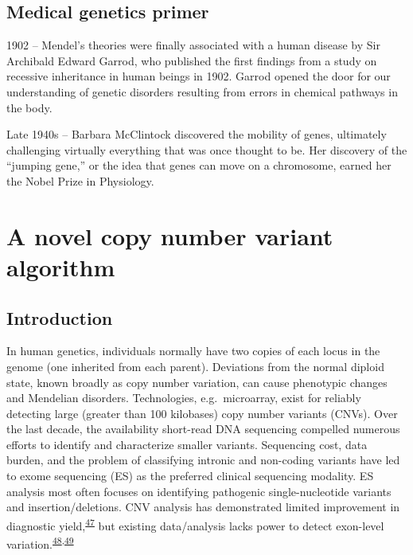 \documentclass[11pt,letterpaper]{book}
\begin{document}
\hypertarget{medical-genetics-primer}{%
\section{Medical genetics primer}\label{medical-genetics-primer}}

1902 -- Mendel's theories were finally associated with a human disease by Sir Archibald Edward Garrod, who published the first findings from a study on recessive inheritance in human beings in 1902. Garrod opened the door for our understanding of genetic disorders resulting from errors in chemical pathways in the body.

Late 1940s -- Barbara McClintock discovered the mobility of genes, ultimately challenging virtually everything that was once thought to be. Her discovery of the ``jumping gene,'' or the idea that genes can move on a chromosome, earned her the Nobel Prize in Physiology.

\hypertarget{a-novel-copy-number-variant-algorithm}{%
\chapter{A novel copy number variant algorithm}\label{a-novel-copy-number-variant-algorithm}}

\hypertarget{introduction}{%
\section{Introduction}\label{introduction}}

In human genetics, individuals normally have two copies of each locus in the genome (one inherited from each parent).
Deviations from the normal diploid state, known broadly as copy number variation, can cause phenotypic changes and Mendelian disorders.
Technologies, e.g.~microarray, exist for reliably detecting large (greater than 100 kilobases) copy number variants (CNVs).
Over the last decade, the availability short-read DNA sequencing compelled numerous efforts to identify and characterize smaller variants.
Sequencing cost, data burden, and the problem of classifying intronic and non-coding variants have led to exome sequencing (ES) as the preferred clinical sequencing modality.
ES analysis most often focuses on identifying pathogenic single-nucleotide variants and insertion/deletions.
CNV analysis has demonstrated limited improvement in diagnostic yield,\textsuperscript{\protect\hyperlink{ref-marchuk:2018aa}{47}} but existing data/analysis lacks power to detect exon-level variation.\textsuperscript{\protect\hyperlink{ref-retterer:2015aa}{48},\protect\hyperlink{ref-yao:2017aa}{49}}
\end{document}
